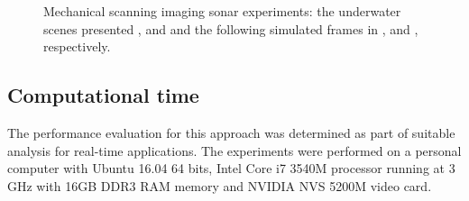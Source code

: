 \documentclass[final,5p,times]{elsarticle}
\begin{document}
\begin{figure}[!h]
{        \label{fig:msis_sim2}
    }
    \captionsetup{justification=centering}
    \caption{Mechanical scanning imaging sonar experiments: the underwater scenes presented ,  and  and the following simulated frames in ,  and , respectively.}
    \label{fig:msis}
\end{figure}


\subsection{Computational time}

The performance evaluation for this approach was determined as part of suitable analysis for real-time applications. The experiments were performed on a personal computer with Ubuntu 16.04 64 bits, Intel Core i7 3540M processor running at 3 GHz with 16GB DDR3 RAM memory and NVIDIA NVS 5200M video card.
\end{document}
